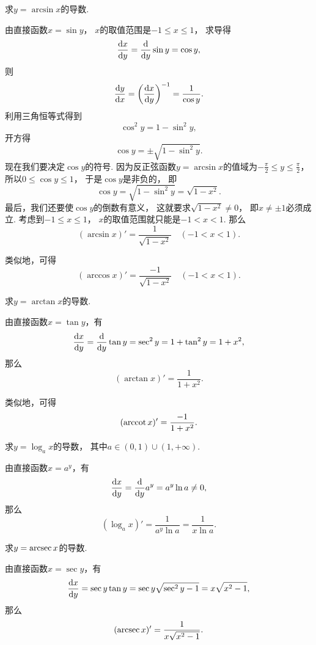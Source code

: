 \begin{example}
求\(y=\arcsin x\)的导数.
\begin{solution}
由直接函数\(x=\sin y\)，
\(x\)的取值范围是\(-1 \leq x \leq 1\)，
求导得\[
	\dv{x}{y}
	= \dv{y} \sin y
	= \cos y,
\]
则\[
	\dv{y}{x}
	= \left(\dv{x}{y}\right)^{-1}
	= \frac1{\cos y}.
\]
利用三角恒等式得到\[
	\cos^2 y = 1 - \sin^2 y,
\]
开方得\[
	\cos y = \pm\sqrt{1 - \sin^2 y}.
\]
现在我们要决定\(\cos y\)的符号.
因为反正弦函数\(y = \arcsin x\)的值域为\(-\frac\pi2 \leq y \leq \frac\pi2\)，
所以\(0 \leq \cos y \leq 1\)，
于是\(\cos y\)是非负的，
即\[
	\cos y
	= \sqrt{1 - \sin^2 y}
	= \sqrt{1 - x^2}.
\]
最后，我们还要使\(\cos y\)的倒数有意义，
这就要求\(\sqrt{1-x^2}\neq0\)，
即\(x\neq\pm1\)必须成立.
考虑到\(-1 \leq x \leq 1\)，
\(x\)的取值范围就只能是\(-1 < x < 1\).
那么\[
	(\arcsin x)' = \frac1{\sqrt{1 - x^2}}
	\quad(-1<x<1).
\]
\end{solution}
\end{example}

类似地，可得\[
	(\arccos x)' = \frac{-1}{\sqrt{1 - x^2}}
	\quad(-1<x<1).
\]

\begin{example}
求\(y=\arctan x\)的导数.
\begin{solution}
由直接函数\(x=\tan y\)，有\[
	\dv{x}{y}
	= \dv{y} \tan y
	= \sec^2 y
	= 1 + \tan^2 y
	= 1 + x^2,
\]
那么\[
	(\arctan x)' = \frac1{1+x^2}.
\]
\end{solution}
\end{example}

类似地，可得\[
	(\arccot x)' = \frac{-1}{1+x^2}.
\]

\begin{example}
求\(y=\log_a x\)的导数，
其中\(a\in(0,1)\cup(1,+\infty)\).
\begin{solution}
由直接函数\(x=a^y\)，有\[
	\dv{x}{y} = \dv{y} a^y = a^y \ln a \neq 0,
\]
那么\[
	(\log_a x)' = \frac1{a^y \ln a} = \frac1{x \ln a}.
\]
\end{solution}
\end{example}

\begin{example}
求\(y = \arcsec x\)的导数.
\begin{solution}
由直接函数\(x=\sec y\)，有\[
	\dv{x}{y}
	= \sec y \tan y
	= \sec y \sqrt{\sec^2 y-1}
	= x \sqrt{x^2-1},
\]
那么\[
	(\arcsec x)'
	= \frac1{x \sqrt{x^2-1}}.
\]
\end{solution}
\end{example}

